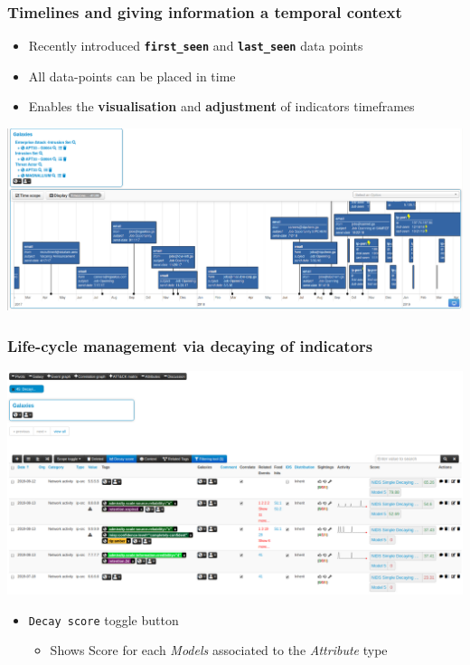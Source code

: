 \begin{frame}
  \frametitle{Timelines and giving information a temporal context}
  \begin{itemize}
    \item Recently introduced {\bf \texttt{first\_seen}} and {\bf \texttt{last\_seen}} data points
    \item All data-points can be placed in time
    \item Enables the {\bf visualisation} and {\bf adjustment} of indicators timeframes 
  \end{itemize}
  \begin{center}
    \includegraphics[width=1.0\linewidth]{timeline-misp-overview.png}
  \end{center}
\end{frame}

\begin{frame}
    \frametitle{Life-cycle management via decaying of indicators}
    \includegraphics[width=1.00\linewidth]{decaying-event.png}
    \begin{itemize}
        \item \texttt{Decay score} toggle button
        \begin{itemize}
            \item Shows Score for each \textit{Models} associated to the \textit{Attribute} type
        \end{itemize}
    \end{itemize}
\end{frame}


